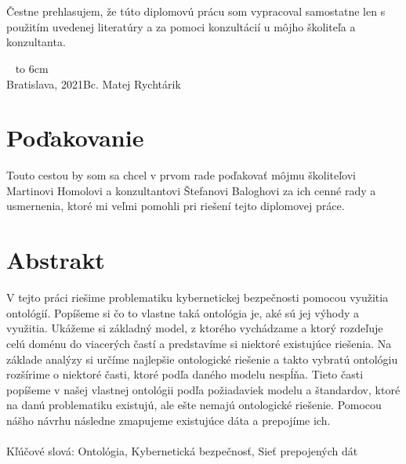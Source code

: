 \documentclass[12pt, a4paper, oneside]{book}
\newcommand\mfauthor{Bc. Matej Rychtárik}
\newcommand\mfplacedate{Bratislava, 2021}
\begin{document}


\thispagestyle{empty}

%

{~}\vspace{12cm}

\noindent
\begin{minipage}{0.25\textwidth}~\end{minipage}
\begin{minipage}{0.75\textwidth}
Čestne prehlasujem, že túto diplomovú prácu som vypracoval samostatne len s použitím uvedenej literatúry a za pomoci konzultácií u môjho školiteľa a konzultanta.
\newline \newline
\end{minipage}
\vfill
~ \hfill {\hbox to 6cm{\dotfill}} \\
\mfplacedate \hfill \mfauthor
\vfill\eject 

\chapter*{Poďakovanie}\label{chap:thank_you}
Touto cestou by som sa chcel v prvom rade poďakovať môjmu školiteľovi Martinovi Homolovi a konzultantovi Štefanovi Baloghovi za ich cenné rady a usmernenia, ktoré mi veľmi pomohli pri riešení tejto diplomovej práce. 
\vfill\eject 

\chapter*{Abstrakt}\label{chap:abstract_sk}
V tejto práci riešime problematiku kybernetickej bezpečnosti pomocou využitia ontológií. Popíšeme si čo to vlastne taká ontológia je, aké sú jej výhody a využitia. Ukážeme si základný model, z ktorého vychádzame a ktorý rozdeľuje celú doménu do viacerých častí a predstavíme si niektoré existujúce riešenia. Na základe analýzy si určíme najlepšie ontologické riešenie a takto vybratú ontológiu rozšírime o niektoré časti, ktoré podľa daného modelu nespĺňa. Tieto časti popíšeme v našej vlastnej ontológii podľa požiadaviek modelu a štandardov, ktoré na danú problematiku existujú, ale ešte nemajú ontologické riešenie. Pomocou nášho návrhu následne zmapujeme existujúce dáta a prepojíme ich.
~\\
\\
Kľúčové slová: Ontológia, Kybernetická bezpečnosť, Sieť prepojených dát
\end{document}
